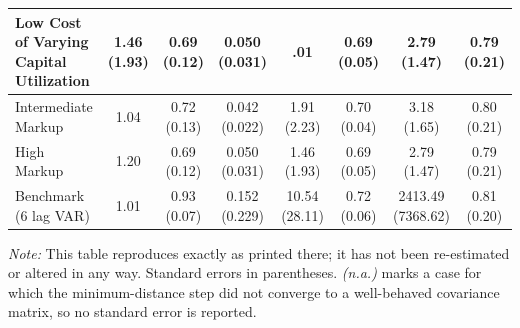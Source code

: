 \begin{table}[htbp]
\begin{tabular}{|l|c|c|c|c|c|c|c|}
        \hline
        \shortstack[l]{Low Cost of Varying\\Capital Utilization}
            & \shortstack{1.46\\(1.93)} & \shortstack{0.69\\(0.12)} & \shortstack{0.050\\(0.031)} & \shortstack{.01\\\mbox{}} & \shortstack{0.69\\(0.05)} & \shortstack{2.79\\(1.47)} & \shortstack{0.79\\(0.21)} \\
        \hline
        Intermediate Markup
            & \shortstack{1.04\\\mbox{}} & \shortstack{0.72\\(0.13)} & \shortstack{0.042\\(0.022)} & \shortstack{1.91\\(2.23)} & \shortstack{0.70\\(0.04)} & \shortstack{3.18\\(1.65)} & \shortstack{0.80\\(0.21)} \\
        \hline
        High Markup
            & \shortstack{1.20\\\mbox{}} & \shortstack{0.69\\(0.12)} & \shortstack{0.050\\(0.031)} & \shortstack{1.46\\(1.93)} & \shortstack{0.69\\(0.05)} & \shortstack{2.79\\(1.47)} & \shortstack{0.79\\(0.21)} \\
        \hline
        Benchmark (6 lag VAR)
            & \shortstack{1.01\\\mbox{}} & \shortstack{0.93\\(0.07)} & \shortstack{0.152\\(0.229)} & \shortstack{10.54\\(28.11)} & \shortstack{0.72\\(0.06)} & \shortstack{2413.49\\(7368.62)} & \shortstack{0.81\\(0.20)} \\
        \hline\hline
    \end{tabular}

    \vspace{0.2cm}
    \raggedright
    \scriptsize{\textit{Note:} This table reproduces \citet[Table~2]{ACEL2005WP} exactly as printed there; it has not been re-estimated or altered in any way.
    Standard errors in parentheses. \textit{(n.a.)} marks a case for which the minimum-distance step did not converge to a well-behaved covariance matrix, so no standard error is reported. }
\end{table}
